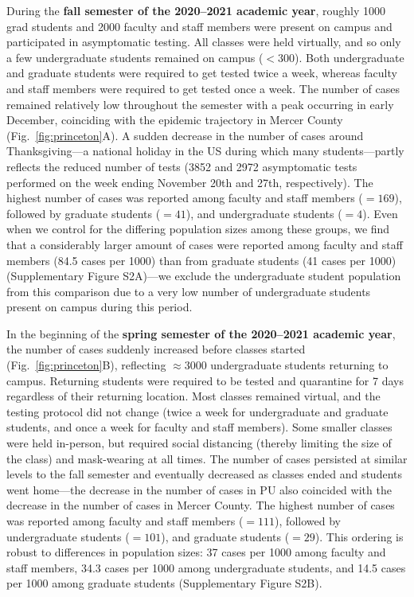 \documentclass[12pt]{article}
\newcommand{\fref}[1]{Fig.~\ref{fig:#1}}
\begin{document}
During the \textbf{fall semester of the 2020--2021 academic year}, roughly 1000 grad students and 2000 faculty and staff members were present on campus and participated in asymptomatic testing. 
All classes were held virtually, and so only a few undergraduate students remained on campus ($<300$).  
Both undergraduate and graduate students were required to get tested twice a week, whereas faculty and staff members were required to get tested once a week.
The number of cases remained relatively low throughout the semester with a peak occurring in early December, coinciding with the epidemic trajectory in Mercer County (\fref{princeton}A).  
A sudden decrease in the number of cases around Thanksgiving---a national holiday in the US during which many students---partly reflects the reduced number of tests (3852 and 2972 asymptomatic tests performed on the week ending November 20th and 27th, respectively).
The highest number of cases was reported among faculty and staff members ($=169$), followed by graduate students ($=41$), and undergraduate students ($=4$).
Even when we control for the differing population sizes among these groups, we find that a considerably larger amount of cases were reported among faculty and staff members (84.5 cases per 1000) than from graduate students (41 cases per 1000) (Supplementary Figure S2A)---we exclude the undergraduate student population from this comparison due to a very low number of undergraduate students present on campus during this period.

In the beginning of the \textbf{spring semester of the 2020--2021 academic year}, the number of cases suddenly increased before classes started (\fref{princeton}B), reflecting $\approx 3000$ undergraduate students returning to campus.
Returning students were required to be tested and quarantine for 7 days regardless of their returning location.
Most classes remained virtual, and the testing protocol did not change (twice a week for undergraduate and graduate students, and once a week for faculty and staff members).
Some smaller classes were held in-person, but required social distancing (thereby limiting the size of the class) and mask-wearing at all times.
The number of cases persisted at similar levels to the fall semester and eventually decreased as classes ended and students went home---the decrease in the number of cases in PU also coincided with the decrease in the number of cases in Mercer County.
The highest number of cases was reported among faculty and staff members ($=111$), followed by undergraduate students ($=101$), and graduate students ($=29$).
This ordering is robust to differences in population sizes: 37 cases per 1000 among faculty and staff members, 34.3 cases per 1000 among undergraduate students, and 14.5 cases per 1000 among graduate students (Supplementary Figure S2B).
\end{document}
